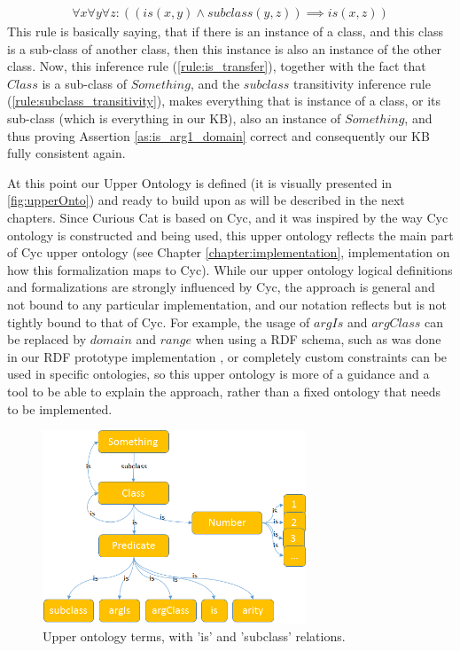\begin{equation}\label{rule:is_transfer}
\begin{gathered}
  \forall x \forall y \forall z: ((is(x,y) \land subclass(y,z)) \implies is(x,z))
\end{gathered} \end{equation}
This rule is basically saying, that if there is an instance of a class, and this
class is a sub-class of another class, then this instance is also an instance of
the other class. Now, this inference rule (\ref{rule:is_transfer}), together 
with the fact that $Class$ is a sub-class of $Something$, and the $subclass$
transitivity inference rule (\ref{rule:subclass_transitivity}), makes everything
 that is instance of a 
class, or its sub-class (which is everything in our KB), also an instance of
$Something$, and thus proving Assertion \ref{as:is_arg1_domain} correct and 
consequently our KB fully consistent again.

At this point our Upper Ontology is defined (it is visually presented in
\autoref{fig:upperOnto}) and ready to build upon as will be
described in the next chapters. Since Curious Cat is based
on Cyc, and it was inspired by the way Cyc ontology is constructed and being 
used, this upper ontology reflects the main part of Cyc upper ontology 
(see Chapter \ref{chapter:implementation}, implementation on how this 
formalization maps to Cyc). While our upper ontology logical definitions and 
formalizations are strongly influenced by Cyc, the approach is general and not 
bound to any particular implementation, and our notation reflects but is not 
tightly bound to that of Cyc. For example, the usage of $argIs$ and $argClass$
can be replaced by $domain$ and $range$ when using a RDF schema, such as was 
done in our RDF prototype implementation \parencite{Bradesko2012a}, or completely custom constraints can be used in specific ontologies, so this
upper ontology is more of a guidance and a tool to be able to explain the approach, rather than a fixed ontology that needs to be implemented.

\begin{figure}[H]
	\centering
		\includegraphics[width=0.7\textwidth]{figures/upperOntology.png}
	\caption{Upper ontology terms, with 'is' and 'subclass' relations.}
	\label{fig:upperOnto}
\end{figure}

